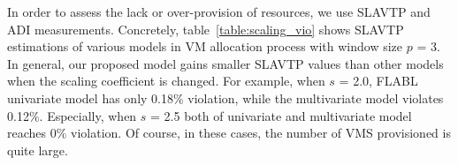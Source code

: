 \documentclass[runningheads]{llncs}
\begin{document}
In order to assess the lack or over-provision of resources, we use SLAVTP and ADI measurements. 
Concretely, table~\ref{table:scaling_vio} shows SLAVTP estimations of various models in VM allocation process with window size $p$ = 3. In general, our proposed model gains smaller SLAVTP values than other models when the scaling coefficient is changed. For example, when $s$ = 2.0, FLABL univariate model has only 0.18$\%$ violation, while the multivariate model violates 0.12$\%$. Especially, when $s$ = 2.5 both of univariate and multivariate model reaches 0$\%$ violation. Of course, in these cases, the number of VMS provisioned is quite large.
\end{document}
